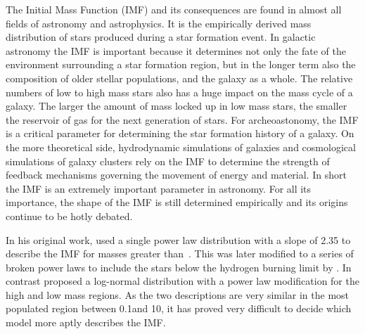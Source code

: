 The Initial Mass Function (IMF) and its consequences are found in almost all fields of astronomy and astrophysics. It is the empirically derived mass distribution of stars produced during a star formation event. In galactic astronomy the IMF is important because it determines not only the fate of the environment surrounding a star formation region, but in the longer term also the composition of older stellar populations, and the galaxy as a whole. The relative numbers of low to high mass stars also has a huge impact on the mass cycle of a galaxy. The larger the amount of mass locked up in low mass stars, the smaller the reservoir of gas for the next generation of stars. For archeoastonomy, the IMF is a critical parameter for determining the star formation history of a galaxy. On the more theoretical side, hydrodynamic simulations of galaxies and cosmological simulations of galaxy clusters rely on the IMF to determine the strength of feedback mechanisms governing the movement of energy and material. In short the IMF is an extremely important parameter in astronomy. 
For all its importance, the shape of the IMF is still determined empirically and its origins continue to be hotly debated. 

In his original work, \citet{salpeter1955} used a single power law distribution with a slope of 2.35 to describe the IMF for masses greater than \,\msun. This was later modified to a series of broken power laws to include the stars below the hydrogen burning limit by \citet{kroupa2001}. In contrast \citet{chabrier2003} proposed a log-normal distribution with a power law modification for the high and low mass regions. As the two descriptions are very similar in the most populated region between 0.1\msun and 10\msune, it has proved very difficult to decide which model more aptly describes the IMF.

